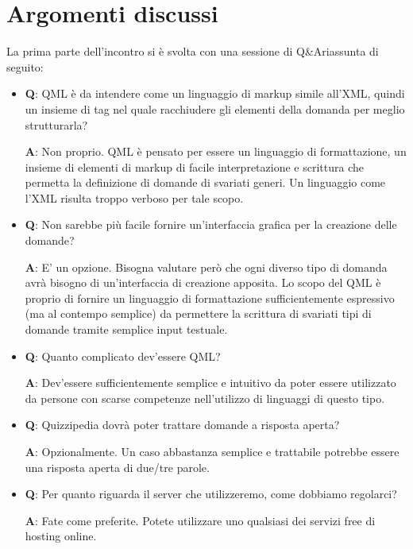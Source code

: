 \documentclass[a4paper,11pt]{article}
\begin{document}
	\newpage
	\section{Argomenti discussi}
		La prima parte dell'incontro si è svolta con una sessione di Q\&A\addglos riassunta di seguito:
		\begin{itemize}
			\item\textbf{Q}: QML è da intendere come un linguaggio di markup simile all'XML, quindi un insieme di tag nel quale racchiudere gli elementi della domanda per meglio strutturarla?
			\newline
			
			\textbf{A}: Non proprio. QML è pensato per essere un linguaggio di formattazione, un insieme di elementi di markup di facile interpretazione e scrittura che permetta la definizione di domande di svariati generi. Un linguaggio come l'XML risulta troppo verboso per tale scopo.
			\item\textbf{Q}: Non sarebbe più facile fornire un'interfaccia grafica per la creazione delle domande?
			\newline
			
			\textbf{A}: E' un opzione. Bisogna valutare però che ogni diverso tipo di domanda avrà bisogno di un'interfaccia di creazione apposita. Lo scopo del QML è proprio di fornire un linguaggio di formattazione sufficientemente espressivo (ma al contempo semplice) da permettere la scrittura di svariati tipi di domande tramite semplice input testuale.
			\item\textbf{Q}: Quanto complicato dev'essere QML?
			\newline
			
			\textbf{A}: Dev'essere sufficientemente semplice e intuitivo da poter essere utilizzato da persone con scarse competenze nell'utilizzo di linguaggi di questo tipo.
			\item\textbf{Q}: Quizzipedia dovrà poter trattare domande a risposta aperta?
			\newline
			
			\textbf{A}: Opzionalmente. Un caso abbastanza semplice e trattabile potrebbe essere una risposta aperta di due/tre parole.
			\item\textbf{Q}: Per quanto riguarda il server che utilizzeremo, come dobbiamo regolarci?
			\newline
			
			\textbf{A}: Fate come preferite. Potete utilizzare uno qualsiasi dei servizi free di hosting online.
		\end{itemize}
\end{document}
